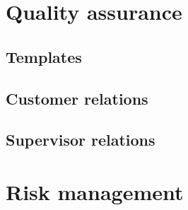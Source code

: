 \section{Quality assurance}
\subsection{Templates}

\subsection{Customer relations}
\subsection{Supervisor relations}

\section{Risk management}